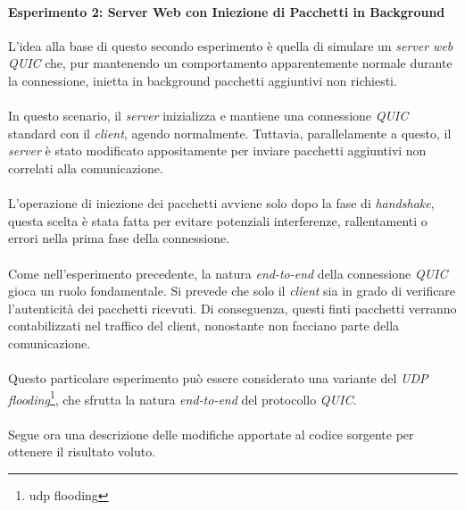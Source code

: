 \paragraph{Esperimento 2: Server Web con Iniezione di Pacchetti in Background}
\noindent L'idea alla base di questo secondo esperimento è quella di simulare un \emph{server web QUIC} che, 
pur mantenendo un comportamento apparentemente normale durante la connessione, inietta in background pacchetti aggiuntivi non richiesti.
\\\\
In questo scenario, il \emph{server} inizializza e mantiene una connessione \emph{QUIC} standard con il \emph{client}, agendo normalmente. Tuttavia, parallelamente a questo, il \emph{server} è stato modificato appositamente per inviare pacchetti aggiuntivi non correlati alla comunicazione.
\\\\
L'operazione di iniezione dei pacchetti avviene solo dopo la fase di \emph{handshake}, questa scelta è stata fatta per evitare potenziali interferenze, rallentamenti o errori nella prima fase della connessione. 
\\\\
Come nell'esperimento precedente, la natura \emph{end-to-end} della connessione \emph{QUIC} gioca un ruolo fondamentale. Si prevede che solo il \emph{client} sia in grado di verificare l'autenticità dei pacchetti ricevuti. 
Di conseguenza, questi finti pacchetti verranno contabilizzati nel traffico del client, nonostante non facciano parte della comunicazione.
\\\\
Questo particolare esperimento può essere considerato una variante del \emph{UDP flooding}\footnote{\gls{udp flooding}}, che sfrutta la natura \emph{end-to-end} del protocollo \emph{QUIC}.
\\\\
Segue ora una descrizione delle modifiche apportate al codice sorgente per ottenere il risultato voluto.
